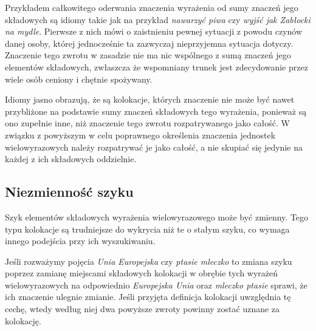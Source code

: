 \par
Przykładem całkowitego oderwania znaczenia wyrażenia od sumy znaczeń jego składowych są idiomy takie jak na przykład \emph{nawarzyć piwa} czy \emph{wyjść jak Zabłocki na mydle}.
Pierwsze z nich mówi o zaistnieniu pewnej sytuacji z powodu czynów danej osoby, której jednocześnie ta zazwyczaj nieprzyjemna sytuacja dotyczy.
Znaczenie tego zwrotu w zasadzie nie ma nic wspólnego z sumą znaczeń jego elementów składowych, zwłaszcza że wspomniany trunek jest zdecydowanie przez wiele osób ceniony i chętnie spożywany.
\par
Idiomy jasno obrazują, że są kolokacje, których znaczenie nie może być nawet przybliżone na podstawie sumy znaczeń składowych tego wyrażenia, ponieważ są ono zupełnie inne, niż znaczenie tego zwrotu rozpatrywanego jako całość.
W związku z powyższym w celu poprawnego określenia znaczenia jednostek wielowyrazowych należy rozpatrywać je jako całość, a nie skupiać się jedynie na każdej z ich składowych oddzielnie.


\subsection{Niezmienność szyku}
Szyk elementów składowych wyrażenia wielowyrazowego może być zmienny.
Tego typu kolokacje są trudniejsze do wykrycia niż te o stałym szyku, co wymaga innego podejścia przy ich wyszukiwaniu.
\par
Jeśli rozważymy pojęcia \emph{Unia Europejska} czy \emph{ptasie mleczko} to zmiana szyku poprzez zamianę miejscami składowych kolokacji w obrębie tych wyrażeń wielowyrazowych na odpowiednio \emph{Europejska Unia} oraz \emph{mleczko ptasie} sprawi, że ich znaczenie ulegnie zmianie.
Jeśli przyjęta definicja kolokacji uwzględnia tę cechę, wtedy według niej dwa powyższe zwroty powinny zostać uznane za kolokację.


